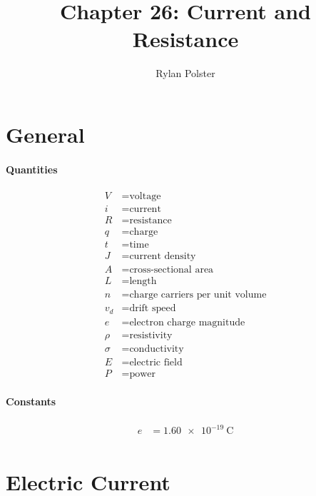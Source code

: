 \documentclass{article}
\title{Chapter 26: Current and Resistance}
\author{Rylan Polster}
\begin{document}
    \maketitle
    
    \section*{General}

        \paragraph{Quantities}
        \begin{align}
            V &= \text{voltage} \nonumber\\
            i &= \text{current} \nonumber\\
            R &= \text{resistance} \nonumber\\
            q &= \text{charge} \nonumber\\
            t &= \text{time} \nonumber\\
            J &= \text{current density} \nonumber\\
            A &= \text{cross-sectional area} \nonumber\\
            L &= \text{length} \nonumber\\
            n &= \text{charge carriers per unit volume} \nonumber\\
            v_d &= \text{drift speed} \nonumber\\
            e &= \text{electron charge magnitude} \nonumber\\
            \rho &= \text{resistivity} \nonumber\\
            \sigma &= \text{conductivity} \nonumber\\
            E &= \text{electric field} \nonumber\\
            P &= \text{power} \nonumber
        \end{align}

        \paragraph{Constants}
        \begin{align}
            e &= \SI{1.60e-19}{\coulomb} \nonumber\\
        \end{align}

    \section{Electric Current}
\end{document}
